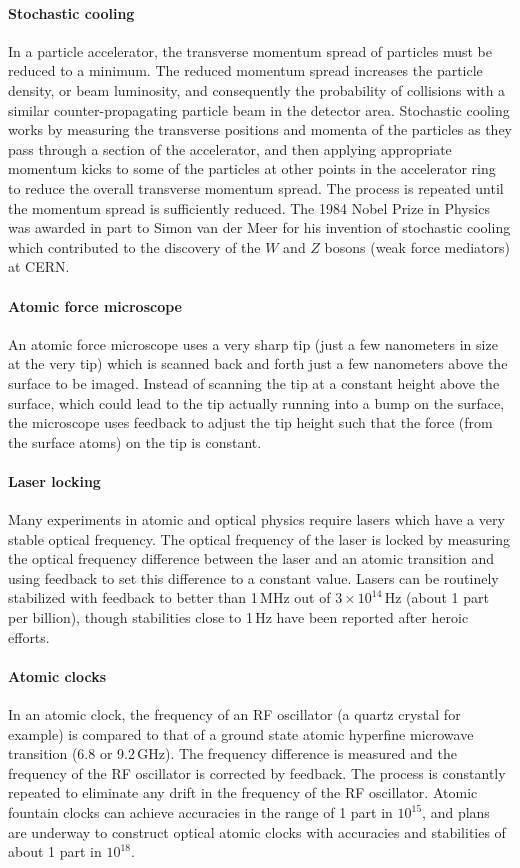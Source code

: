 \documentclass{article}
\begin{document}
\paragraph{Stochastic cooling} In a particle accelerator, the transverse momentum spread of particles must be reduced to a minimum. The reduced momentum spread increases the particle density, or beam luminosity, and consequently the probability of collisions with a similar counter-propagating particle beam in the detector area. Stochastic cooling works by measuring the transverse positions and momenta of the particles as they pass through a section of the accelerator, and then applying appropriate momentum kicks to some of the particles at other points in the accelerator ring to reduce the overall transverse momentum spread. The process is repeated until the momentum spread is sufficiently reduced. The 1984 Nobel Prize in Physics was awarded in part to Simon van der Meer for his invention of stochastic cooling which contributed to the discovery of the $W$ and $Z$ bosons (weak force mediators) at CERN.

\paragraph{Atomic force microscope} An atomic force microscope uses a very sharp tip (just a few nanometers in size at the very tip) which is scanned back and forth just a few nanometers above the surface to be imaged. Instead of scanning the tip at a constant height above the surface, which could lead to the tip actually running into a bump on the surface, the microscope uses feedback to adjust the tip height such that the force (from the surface atoms) on the tip is constant.

\paragraph{Laser locking} Many experiments in atomic and optical physics require lasers which have a very stable optical frequency. The optical frequency of the laser is locked by measuring the optical frequency difference between the laser and an atomic transition and using feedback to set this difference to a constant value. Lasers can be routinely stabilized with feedback to better than 1\,MHz out of $3 \times 10^{14}$\,Hz (about 1 part per billion), though stabilities close to 1\,Hz have been reported after heroic efforts.

\paragraph{Atomic clocks} In an atomic clock, the frequency of an RF oscillator (a quartz crystal for example) is compared to that of a ground state atomic hyperfine microwave transition (6.8 or 9.2\,GHz). The frequency difference is measured and the frequency of the RF oscillator is corrected by feedback. The process is constantly repeated to eliminate any drift in the frequency of the RF oscillator. Atomic fountain clocks can achieve accuracies in the range of 1 part in $10^{15}$, and plans are underway to construct optical atomic clocks with accuracies and stabilities of about 1 part in $10^{18}$.
\end{document}

